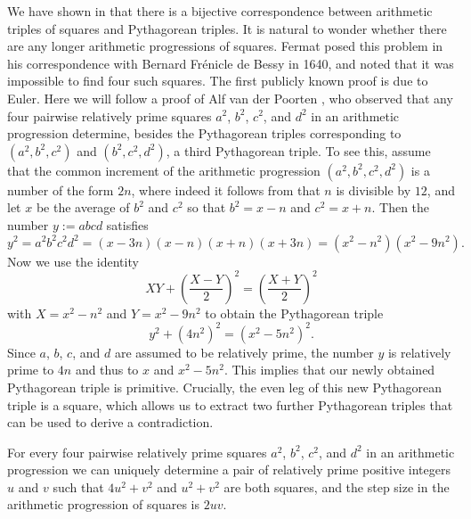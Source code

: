 We have shown in  that there is a bijective correspondence between arithmetic triples of squares and Pythagorean triples. It is natural to wonder whether there are any longer arithmetic progressions of squares. Fermat posed this problem in his correspondence with Bernard Frénicle de Bessy in 1640, and noted that it was impossible to find four such squares. The first publicly known proof is due to Euler. Here we will follow a proof of Alf van der Poorten \cite{vanderpoorten2007}, who observed that any four pairwise relatively prime squares $a^2$, $b^2$, $c^2$, and $d^2$ in an arithmetic progression determine, besides the Pythagorean triples corresponding to $(a^2,b^2,c^2)$ and $(b^2,c^2,d^2)$, a third Pythagorean triple. To see this, assume that the common increment of the arithmetic progression $(a^2,b^2,c^2,d^2)$ is a number of the form $2n$, where indeed it follows from  that $n$ is divisible by $12$, and let $x$ be the average of $b^2$ and $c^2$ so that $b^2=x-n$ and $c^2=x+n$. Then the number $y:=abcd$ satisfies
\begin{equation*}
  y^2=a^2b^2c^2d^2=(x-3n)(x-n)(x+n)(x+3n)=(x^2-n^2)(x^2-9n^2).
\end{equation*}
Now we use the identity
\begin{equation*}
  XY+\left(\frac{X-Y}{2}\right)^2=\left(\frac{X+Y}{2}\right)^2
\end{equation*}
with $X=x^2-n^2$ and $Y=x^2-9n^2$ to obtain the Pythagorean triple
\begin{equation*}
  y^2+(4n^2)^2=(x^2-5n^2)^2.
\end{equation*}
Since $a$, $b$, $c$, and $d$ are assumed to be relatively prime, the number $y$ is relatively prime to $4n$ and thus to $x$ and $x^2-5n^2$. This implies that our newly obtained Pythagorean triple is primitive. Crucially, the even leg of this new Pythagorean triple is a square, which allows us to extract two further Pythagorean triples that can be used to derive a contradiction.

\begin{lemma}\label{lemma:vanderpoorten}
  For every four pairwise relatively prime squares $a^2$, $b^2$, $c^2$, and $d^2$ in an arithmetic progression we can uniquely determine a pair of relatively prime positive integers $u$ and $v$ such that $4u^2+v^2$ and $u^2+v^2$ are both squares, and the step size in the arithmetic progression of squares is $2uv$.
\end{lemma}

